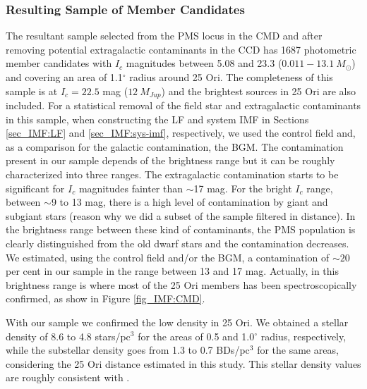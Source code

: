 \documentclass[12pt]{article}
\begin{document}
\subsubsection{Resulting Sample of Member Candidates}
\label{sec_IMF:sample}
The resultant sample selected from the PMS locus in the CMD and after removing potential extragalactic contaminants in the CCD has 1687 photometric member candidates with $I_c$ magnitudes between 5.08 and 23.3 ($0.011-13.1\ M_\odot$) and covering an area of 1.1$^\circ$ radius around 25 Ori. The completeness of this sample is at $I_c=22.5$ mag ($12\ M_{Jup}$) and the brightest sources in 25 Ori are also included. For a statistical removal of the field star and extragalactic contaminants in this sample, when constructing the LF and system IMF in Sections \ref{sec_IMF:LF} and \ref{sec_IMF:sys-imf}, respectively, we used the control field and, as a comparison for the galactic contamination, the BGM. The contamination present in our sample depends of the brightness range but it can be roughly characterized into three ranges. The extragalactic contamination starts to be significant for $I_c$ magnitudes fainter than $\sim$17 mag. For the bright $I_c$ range, between $\sim$9 to 13 mag, there is a high level of contamination by giant and subgiant stars (reason why we did a subset of the sample filtered in distance). In the brightness range between these kind of contaminants, the PMS population is clearly distinguished from the old dwarf stars and the contamination decreases. We estimated, using the control field and/or the BGM, a contamination of $\sim20$ per cent in our sample in the range between 13 and 17 mag. Actually, in this brightness range is where most of the 25 Ori members has been spectroscopically confirmed, as show in Figure \ref{fig_IMF:CMD}.

With our sample we confirmed the low density in 25 Ori. We obtained a stellar density of 8.6 to 4.8 stars/pc$^3$ for the areas of 0.5 and 1.0$^\circ$ radius, respectively, while the substellar density goes from 1.3 to 0.7 BDs/pc$^3$ for the same areas, considering the 25 Ori distance estimated in this study. This stellar density values are roughly consistent with \citet{Briceno2007,Downes2014,Briceno2018}.
\end{document}
